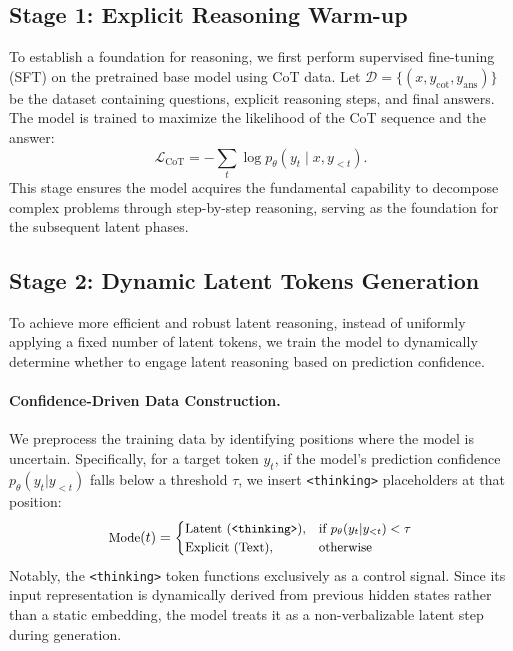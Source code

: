 \documentclass{article}
\theoremstyle{plain}
\theoremstyle{definition}
\theoremstyle{remark}
\begin{document}
\subsection{Stage 1: Explicit Reasoning Warm-up}
To establish a foundation for reasoning, we first perform supervised fine-tuning (SFT) on the pretrained base model using CoT data. Let $\mathcal{D} = \{(x, y_{\text{cot}}, y_{\text{ans}})\}$ be the dataset containing questions, explicit reasoning steps, and final answers. The model is trained to maximize the likelihood of the CoT sequence and the answer:
\begin{equation}
    \mathcal{L}_{\text{CoT}} = -\sum_{t} \log p_\theta(y_t \mid x, y_{<t}).
\end{equation}
This stage ensures the model acquires the fundamental capability to decompose complex problems through step-by-step reasoning, serving as the foundation for the subsequent latent phases.

\subsection{Stage 2: Dynamic Latent Tokens Generation}

To achieve more efficient and robust latent reasoning, instead of uniformly applying a fixed number of latent tokens, we train the model to dynamically determine whether to engage latent reasoning based on prediction confidence.

\paragraph{Confidence-Driven Data Construction.} We preprocess the training data by identifying positions where the model is uncertain. Specifically, for a target token $y_t$, if the model's prediction confidence $p_\theta(y_t|y_{<t})$ falls below a threshold $\tau$, we insert \texttt{<thinking>} placeholders at that position:
\begin{equation}
    \small
    \text{Mode}(t) = 
    \begin{cases} 
    \text{Latent (\texttt{<thinking>})}, & \text{if } p_\theta(y_t|y_{<t}) < \tau \\
    \text{Explicit (Text)}, & \text{otherwise}
    \end{cases}
\end{equation}
Notably, the \texttt{<thinking>} token functions exclusively as a control signal. Since its input representation is dynamically derived from previous hidden states rather than a static embedding, the model treats it as a non-verbalizable latent step during generation.
\end{document}

